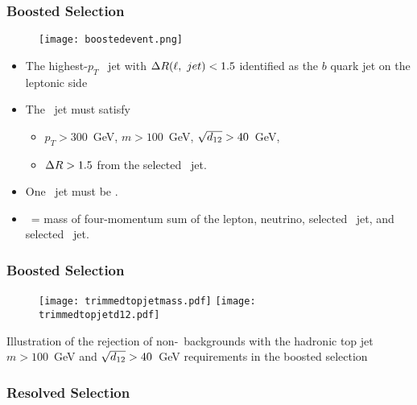 \begin{frame}[label=boostedsel]
    \frametitle{Boosted Selection}
\begin{figure}
\centering
\texttt{[image: boostedevent.png]}
\end{figure}
\vfill
\begin{itemize}
    \item The highest-$p_T$ \smallr\ jet with $\Delta R(\ell,\ jet) < 1.5$
        identified as the $b$ quark jet on the leptonic side

    \item The  \larger\ jet must satisfy
    \begin{itemize}
        \item $p_T > 300$~GeV, $m > 100$~GeV, $\sqrt{d_{12}} > 40$~GeV,
        \item $\Delta R > 1.5$ from the selected \smallr\ jet.
    \end{itemize}

    \item One \smallr\ jet must be .

    \item \mtt\ = mass of four-momentum sum of the lepton, neutrino,
        selected \smallr\ jet, and selected \larger\ jet.
\end{itemize}
\end{frame}

\begin{frame}
    \frametitle{Boosted Selection}
\begin{figure}
\centering
\texttt{[image: trimmedtopjetmass.pdf]}
\texttt{[image: trimmedtopjetd12.pdf]}
\end{figure}
\vfill
\centering
Illustration of the rejection of non-\ttbar\ backgrounds with the
hadronic top jet $m > 100$~GeV and $\sqrt{d_{12}} > 40$~GeV requirements in
the boosted selection
\end{frame}

\subsubsection{Resolved Selection}

